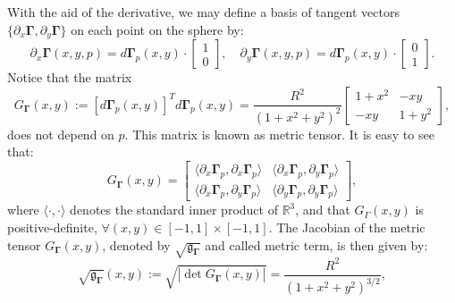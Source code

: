 With the aid of the derivative, we may define a basis of tangent vectors 
$\{{\partial_x \boldsymbol{\Gamma}},  {\partial_y \boldsymbol{\Gamma}}\}$ on each point on the sphere by:
\begin{equation*}
	{\partial_x \boldsymbol{\boldsymbol{\Gamma}}}(x,y,p) = d\boldsymbol{\boldsymbol{\Gamma}}_{p}(x,y) \cdot
	\begin{bmatrix}
		 1 \\
		 0
	\end{bmatrix}, \quad
	{\partial_y \boldsymbol{\boldsymbol{\Gamma}}}(x,y,p) = d\boldsymbol{\boldsymbol{\Gamma}}_{p}(x,y) \cdot
	\begin{bmatrix}
		 0 \\
		 1
	\end{bmatrix}.
\end{equation*}
Notice that the matrix
\begin{equation*}
	\label{chp-cs-eqdistant-Gammatensor}
	G_{\boldsymbol{\Gamma}}(x,y) := 
	[d\boldsymbol{\Gamma}_{p}(x,y)]^Td\boldsymbol{\Gamma}_{p}(x,y)
	= \frac{R^2}{(1 + x^2 + y^2)^2}
	\begin{bmatrix}
		  1+ x^2 &  -xy \\
		 -xy & 1 + y^2
	\end{bmatrix},
\end{equation*}
does not depend on $p$.
This matrix is known as metric tensor.
It is easy to see that:
\begin{equation}
	\label{chp-cs-eqdistant-Gamma-metric-tensor}
	G_{\boldsymbol{\Gamma}}(x,y) = 
	\begin{bmatrix}
		\langle  {\partial_x \boldsymbol{\Gamma}_p}, {\partial_x  \boldsymbol{\Gamma}_p} \rangle & 
		\langle  {\partial_x \boldsymbol{\Gamma}_p}, {\partial_y  \boldsymbol{\Gamma}_p} \rangle \\
		\langle  {\partial_x  \boldsymbol{\Gamma}_p}, {\partial_y  \boldsymbol{\Gamma}_p} \rangle  &
		\langle  {\partial_y  \boldsymbol{\Gamma}_p}, {\partial_y  \boldsymbol{\Gamma}_p} \rangle 
	\end{bmatrix},
\end{equation}
where $\langle \cdot, \cdot \rangle$ denotes 
the standard inner product of $\mathbb{R}^3$,
and that $G_{\Gamma}(x,y)$ is positive-definite, 
$\forall (x,y) \in [-1,1]\times[-1,1]$.
The Jacobian of the metric tensor $G_{\boldsymbol{\Gamma}}(x,y)$, denoted by $\sqrt{\mathfrak{g}_{\boldsymbol{\Gamma}}}$ and called metric term, is then given by:
\begin{equation*}
        \sqrt{\mathfrak{g}_{\boldsymbol{\Gamma}}}(x,y) :=
	\sqrt{|\det{G_{\boldsymbol{\Gamma}}(x,y)}|} = \frac{R^2}{(1+x^2+y^2)^{3/2}},
\end{equation*}
